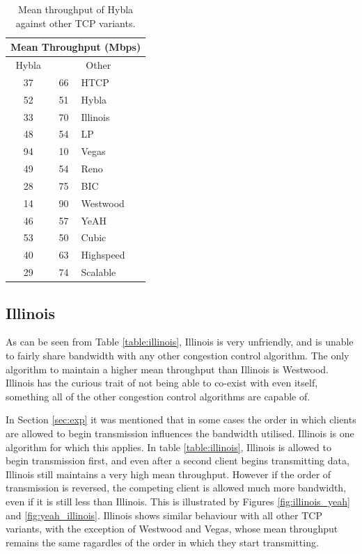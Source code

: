 \documentclass[11pt,a4paper,twocolumn]{article}
\begin{document}
\begin{table}[h!]
	\begin{center}
		\begin{tabular}{| c | c | l |}
    			\hline
			\multicolumn{3}{|c|}{Mean Throughput (Mbps)} \\
    			\hline
    			Hybla &  \multicolumn{2}{|c|}{Other}  \\
			\hline
    			37 & 66 & HTCP \\
			\hline
    			52 & 51 & Hybla \\
			\hline
    			33 & 70 & Illinois \\
			\hline
    			48 & 54 & LP \\
			\hline
    			94 & 10 & Vegas \\
			\hline
    			49 & 54 & Reno \\
			\hline
    			28 & 75 & BIC \\
			\hline
    			14 & 90 & Westwood \\
			\hline
    			46 & 57 & YeAH \\
			\hline
    			53 & 50 & Cubic \\
			\hline
    			40 & 63 & Highspeed \\
			\hline
    			29 & 74 & Scalable \\
    			\hline
    		\end{tabular}
  	\end{center}
  	\caption{Mean throughput of Hybla against other TCP variants.}
	\label{table:hybla}
\end{table}

\subsection{Illinois}
\label{subsec:illinois}
As can be seen from Table \ref{table:illinois}, Illinois is very unfriendly, and
is unable to fairly share bandwidth with any other congestion control algorithm. The only algorithm to maintain a higher mean throughput than Illinois is Westwood. Illinois has the curious trait
of not being able to co-exist with even itself, something all of the other congestion control algorithms are
capable of.

In Section \ref{sec:exp} it was mentioned that in some cases the order in which clients are allowed to begin transmission influences the bandwidth utilised. Illinois is one algorithm for which this applies. In table
\ref{table:illinois}, Illinois is allowed to begin transmission first, and even after a second client begins
transmitting data, Illinois still maintains a very high mean throughput. However if the order of transmission
is reversed, the competing client is allowed much more bandwidth, even if it is still less than Illinois.
This is illustrated by Figures \ref{fig:illinois_yeah} and \ref{fig:yeah_illinois}. Illinois shows similar
behaviour with all other TCP variants, with the exception of Westwood and Vegas, whose mean
throughput remains the same ragardles of the order in which they start transmitting.
\end{document}
